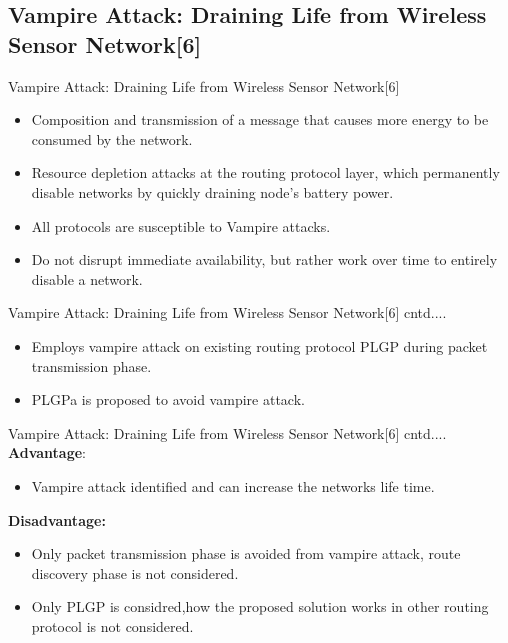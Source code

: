   
\subsection{Vampire Attack: Draining Life from  Wireless Sensor Network[6]}
\begin{frame}{Vampire Attack: Draining Life from  Wireless Sensor Network[6]}
\begin{itemize}
\item Composition and transmission of a message that causes more energy to be consumed by the network.
\item Resource depletion attacks at the routing protocol layer, which permanently disable networks by quickly draining node's battery power.
\item All protocols are susceptible to Vampire attacks.
\item  Do not disrupt immediate availability, but rather work over time to entirely disable a network.
\end{itemize}
\end{frame}

\begin{frame}{Vampire Attack: Draining Life from  Wireless Sensor Network[6] cntd....}
\begin{itemize}
\item Employs vampire attack on existing routing protocol PLGP during packet transmission phase.

\item PLGPa is proposed to avoid vampire attack.
\end{itemize}
\end{frame}

\begin{frame}{Vampire Attack: Draining Life from  Wireless Sensor Network[6] cntd....}
\textbf{Advantage}:
\begin{itemize}
 

\item Vampire attack identified and can increase the networks life time.
\end{itemize}
 \textbf{Disadvantage:}
\begin{itemize}
 
\item Only packet transmission phase is avoided from vampire attack, route discovery phase is not considered.

\item Only  PLGP is considred,how the proposed solution works in other routing protocol is not considered.
\end{itemize}
\end{frame}

